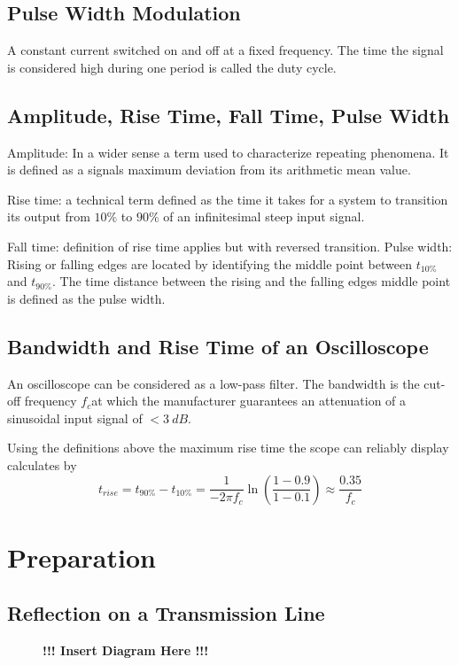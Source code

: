     \subsection*{Pulse Width Modulation}
        A constant current switched on and off at a fixed frequency. The time the signal is considered high during one period
        is called the duty cycle.
    \subsection*{Amplitude, Rise Time, Fall Time, Pulse Width}
        Amplitude: In a wider sense a term used to characterize repeating phenomena. It is defined as a signals maximum deviation
        from its arithmetic mean value.\par
        Rise time: a technical term defined as the time it takes for a system to transition its output from \( 10\% \) to \( 90\% \)
        of an infinitesimal steep input signal.\par
        Fall time: definition of rise time applies but with reversed transition.
        Pulse width: Rising or falling edges are located by identifying the middle point between \( t_{10\%} \) and \( t_{90\%} \).
        The time distance between the rising and the falling edges middle point is defined as the pulse width.
    \subsection*{Bandwidth and Rise Time of an Oscilloscope}
        An oscilloscope can be considered as a low-pass filter. The bandwidth is the cut-off frequency \( f_c \)at which the manufacturer
        guarantees an attenuation of a sinusoidal input signal of \( < \SI{3}{dB} \).\par
        Using the definitions above the maximum rise time the scope can reliably display calculates by
        \begin{equation}
            t_{rise} = t_{90\%} - t_{10\%} = \frac{1}{-2\pi f_c} \ln\left( \frac{1-0.9}{1-0.1} \right) \approx \frac{0.35}{f_c}
            \label{eq:bandwidth_and_riseTime}
        \end{equation}
\section{Preparation}
%
    \subsection{Reflection on a Transmission Line}
        \begin{figure}[h]
            \centering
            \begin{framed}
                \textbf{!!! Insert Diagram Here !!!}
            \end{framed}
        \end{figure}
